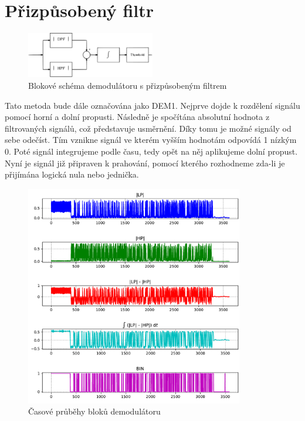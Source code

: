 \clearpage

\section*{Přizpůsobený filtr}

\begin{figure}[H]
    \centering
    \includegraphics[width=0.5\textwidth]{img/dem1.pdf}
    \caption{Blokové schéma demodulátoru s přizpůsobeným filtrem}
\end{figure}

Tato metoda bude dále označována jako DEM1. Nejprve dojde k rozdělení signálu pomocí horní a dolní propusti. Následně je spočítána absolutní hodnota z filtrovaných signálů, což představuje usměrnění. Díky tomu je možné signály od sebe odečíst. Tím vznikne signál ve kterém vyšším hodnotám odpovídá 1 nízkým 0. Poté signál integrujeme podle času, tedy opět na něj aplikujeme dolní propust. Nyní je signál již připraven k prahování, pomocí kterého rozhodneme zda-li je přijímána logická nula nebo jednička.

\begin{figure}[H]
    \centering
    \includegraphics[width=0.85\textwidth]{img/dem1_graph.pdf}
    \caption{Časové průběhy bloků demodulátoru}
\end{figure}